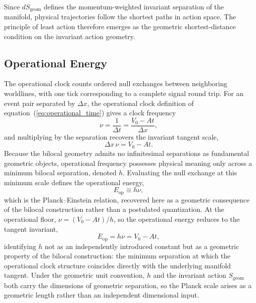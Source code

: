 \documentclass[fontsize=12pt, paper=a4]{scrartcl}
\begin{document}
Since $dS_{\mathrm{geom}}$ defines the momentum-weighted invariant separation of the manifold, physical trajectories follow the shortest paths in action space. The principle of least action therefore emerges as the geometric shortest-distance condition on the invariant action geometry.

\subsection{Operational Energy}
The operational clock counts ordered null exchanges between neighboring worldlines, with one tick corresponding to a complete signal round trip. For an event pair separated by $\Delta x$, the operational clock definition of equation~(\ref{eq:operational_time}) gives a clock frequency
\begin{equation}
\nu = \frac{1}{\Delta t} = \frac{V_0-At}{\Delta x},
\end{equation}
and multiplying by the separation recovers the invariant tangent scale,
\begin{equation}
\Delta x\,\nu = V_0-At.
\end{equation}
Because the bilocal geometry admits no infinitesimal separations as fundamental geometric objects, operational frequency possesses physical meaning only across a minimum bilocal separation, denoted $h$. Evaluating the null exchange at this minimum scale defines the operational energy,
\begin{equation}
E_{\mathrm{op}} \equiv h\nu,
\label{eq:operational_energy_relation}
\end{equation}
which is the Planck--Einstein relation, recovered here as a geometric consequence of the bilocal construction rather than a postulated quantization. At the operational floor, $\nu = (V_0-At)/h$, so the operational energy reduces to the tangent invariant,
\begin{equation}
E_{\mathrm{op}} = h\nu = V_0 - At,
\label{eq:operational_floor_identity}
\end{equation}
identifying $h$ not as an independently introduced constant but as a geometric property of the bilocal construction: the minimum separation at which the operational clock structure coincides directly with the underlying manifold tangent. Under the geometric unit convention, $h$ and the invariant action $S_{\mathrm{geom}}$ both carry the dimensions of geometric separation, so the Planck scale arises as a geometric length rather than an independent dimensional input.
\end{document}

